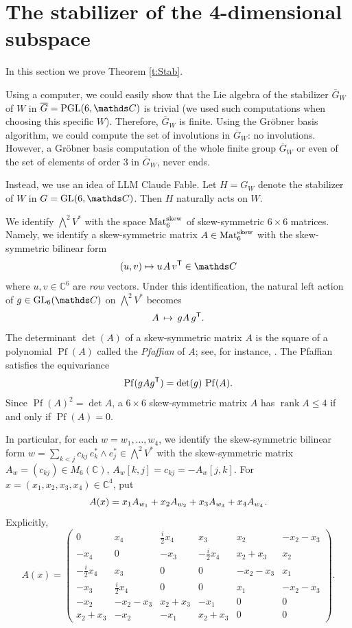 \documentclass[11pt]{amsart}
\theoremstyle{plain}
\theoremstyle{definition}
\newcommand{\hs}{\kern 0.8pt}
\newcommand{\C}{{\mathds C}}
\newcommand{\GL}{{\rm GL}}
\newcommand{\ol}{\overline}
\newcommand{\PGL}{{\rm PGL}}
\renewcommand{\Lambda}{\textstyle\bigwedge}
\newcommand{\Pf}{\operatorname{Pf}}
\newcommand{\rk}{\operatorname{rank}}
\newcommand{\Mat}{{\rm Mat}}
\newcommand{\Skew}{{\rm skew}}
\newcommand{\TT}{{\sf T}}
\begin{document}
\section{The stabilizer of the 4-dimensional subspace}
\label{s:Stab-W}

In this section we prove Theorem \ref{t:Stab}.

Using a computer, we could easily show that the Lie algebra of the stabilizer $\ol G_W$ of $W$ in $\ol G=\PGL(6,\C)$ is trivial
(we used such computations when choosing  this specific $W$).
Therefore, $\ol G_W$ is finite.
Using the Gr\"obner basis algorithm,
we could compute the set of involutions in $\ol G_W$: no involutions.
However, a Gr\"obner basis computation of the whole finite group $\ol G_W$
or even of the set of elements of order 3 in $\ol G_W$, never ends.

Instead, we use an idea of LLM Claude Fable. Let $H=G_W$ denote the stabilizer of $W$
in $G=\GL(6,\C)$. Then $H$ naturally acts on $W$.

We identify $\Lambda^2 V^*$ with the space $\Mat_6^\Skew$ of skew-symmetric $6\times 6$ matrices.
Namely, we identify a skew-symmetric matrix $A\in \Mat_6^\Skew$ with the  skew-symmetric bilinear form
\[(u,v)\mapsto u\hs A \, v^\TT\in\C\]
where $u,v\in\C^6$ are {\em row} vectors.
Under this identification, the natural left action of $g\in\GL_6(\C)$ on $\Lambda^2V^*$ becomes
\begin{equation}\label{eq:action}
A\,\mapsto\, g A\,g^\TT.
\end{equation}
The determinant $\det(A)$ of a skew-symmetric matrix $A$ is the square of a polynomial $\Pf(A)$
called the {\em Pfaffian} of $A$; see, for instance, \cite[XV.\S9]{Lang}.
The Pfaffian satisfies the equivariance
\begin{equation}\label{eq:equivariance}
\Pf(g A g^\TT)=\det(g)\,\Pf(A).
\end{equation}
Since  $\Pf(A)^2=\det A$,  a $6\times6$ skew-symmetric matrix
$A$ has $\rk A\le4$ if and only if $\Pf(A)=0$.

In particular, for each $w=w_1,\dots,w_4$, we identify the skew-symmetric bilinear form
$w=\sum_{k<j}c_{kj}\,e_k^*\wedge e_j^*\in\Lambda^2V^*$ with the skew-symmetric
matrix $A_w=(c_{kj})\in M_6(\C)$, $A_w[k,j]=c_{kj}=-A_w[j,k]$.
For $x=(x_1,x_2,x_3,x_4)\in\C^4$, put
\[A(x)=x_1A_{w_1}+x_2A_{w_2}+x_3A_{w_3}+x_4A_{w_4}\hs.\]
Explicitly,
\begin{equation}\label{eq:Amatrix}
A(x)=\begin{pmatrix}
0 & x_4 & \tfrac{i}{2}x_4 & x_3 & x_2 & -x_2-x_3\\[1pt]
-x_4 & 0 & -x_3 & -\tfrac{i}{2}x_4 & x_2+x_3 & x_2\\[1pt]
-\tfrac{i}{2}x_4 & x_3 & 0 & 0 & -x_2-x_3 & x_1\\[1pt]
-x_3 & \tfrac{i}{2}x_4 & 0 & 0 & x_1 & -x_2-x_3\\[1pt]
-x_2 & -x_2-x_3 & x_2+x_3 & -x_1 & 0 & 0\\[1pt]
x_2+x_3 & -x_2 & -x_1 & x_2+x_3 & 0 & 0
\end{pmatrix}.
\end{equation}
\end{document}
